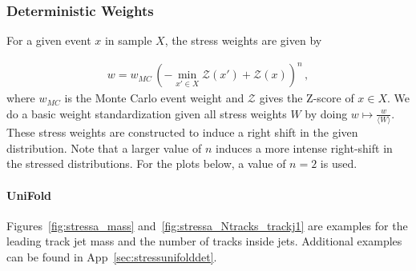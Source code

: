 \documentclass[NOTE, atlasdraft=true, texlive=2016, UKenglish]{\ATLASLATEXPATH atlasdoc}
\begin{document}
\clearpage

\subsubsection{Deterministic Weights}
\label{sec:stress:deterministic}

For a given event $x$ in sample $X$, the stress weights are given by 

\begin{align}
\label{eq:stressweights}
w = w_{MC}\,(-\min_{x'\in X}\mathcal{Z}(x')+\mathcal{Z}(x))^n\,,
\end{align}
%
where $w_{MC}$ is the Monte Carlo event weight and $\mathcal{Z}$ gives the Z-score of $x\in X$. We do a basic weight standardization given all stress weights $W$ by doing $w\mapsto\frac{w}{\langle W\rangle}$. These stress weights are constructed to induce a right shift in the given distribution. Note that a larger value of $n$ induces a more intense right-shift in the stressed distributions.  For the plots below, a value of $n=2$ is used.

\paragraph{UniFold}

Figures~\ref{fig:stressa_mass} and~\ref{fig:stressa_Ntracks_trackj1} are examples for the leading track jet mass and the number of tracks inside jets.  Additional examples can be found in App~\ref{sec:stressunifolddet}.
\end{document}
